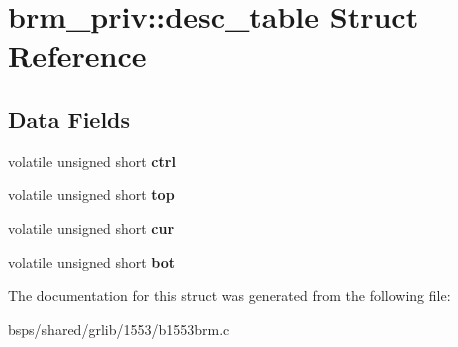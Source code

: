 \hypertarget{structbrm__priv_1_1desc__table}{}\section{brm\+\_\+priv\+::desc\+\_\+table Struct Reference}
\label{structbrm__priv_1_1desc__table}
\subsection*{Data Fields}
\begin{DoxyCompactItemize}
\item 
\mbox{\label{structbrm__priv_1_1desc__table_a666b373595cdc847f77ed4dfedaac28e}} 
volatile unsigned short {\bfseries ctrl}
\item 
\mbox{\label{structbrm__priv_1_1desc__table_ab802d3efe7d0a54012df323a985aefd2}} 
volatile unsigned short {\bfseries top}
\item 
\mbox{\label{structbrm__priv_1_1desc__table_a58748790569800eab1a6d7fb9d381523}} 
volatile unsigned short {\bfseries cur}
\item 
\mbox{\label{structbrm__priv_1_1desc__table_a809dbab3b49679efd3097239f3eeee88}} 
volatile unsigned short {\bfseries bot}
\end{DoxyCompactItemize}


The documentation for this struct was generated from the following file\+:\begin{DoxyCompactItemize}
\item 
bsps/shared/grlib/1553/b1553brm.\+c\end{DoxyCompactItemize}
